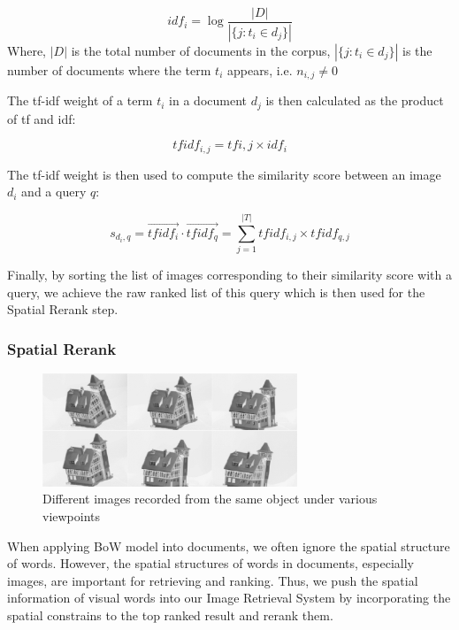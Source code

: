 \begin{equation}
        idf_{i} = \log{\frac{\left|D\right|}{\left|\{j: t_{i} \in d_{j}\}\right|}}
\end{equation}
Where, $\left|D\right|$ is the total number of documents in the corpus, $\left|\{j: t_{i} \in d_{j}\}\right|$ is the number of documents where the term $t_{i}$ appears, i.e. $n_{i, j} \ne 0$

The tf-idf weight of a term $t_{i}$ in a document $d_{j}$ is then calculated as the product of tf and idf:

\begin{equation}
{tfidf}_{i, j} = tf{i, j} \times idf_{i}
\end{equation}

The tf-idf weight is then used to compute the similarity score between an image $d_{i}$ and a query $q$:

\begin{equation}
s_{d_{i}, q} = \vec{{tfidf}_{i}} \cdot \vec{{tfidf}_{q}} = \sum\limits_{j = 1}^{\left|T\right|} {tfidf}_{i, j} \times {tfidf}_{q, j}
\end{equation} 

Finally, by sorting the list of images corresponding to their similarity score with a query, we achieve the raw ranked list of this query which is then used for the Spatial Rerank step.

\subsubsection{Spatial Rerank} \label{section:spatial_rerank}

\begin{figure}
    \centering
    \includegraphics[width=3.0in]{houses.png}
    \caption{Different images recorded from the same object under various viewpoints}
    \label{fig:image_houses}
\end{figure}

When applying BoW model into documents, we often ignore the spatial structure of words. However, the spatial structures of words in documents, especially images, are important for retrieving and ranking. Thus, we push the spatial information of visual words into our Image Retrieval System by incorporating the spatial constrains to the top ranked result and rerank them. 

